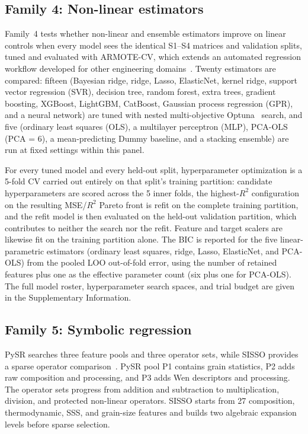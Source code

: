 \documentclass[5p,times,twocolumn]{elsarticle}
\newcommand{\familyfour}{Non-linear estimators}
\newcommand{\familyfive}{Symbolic regression}
\begin{document}
\subsection{Family 4: \familyfour}

Family~4 tests whether non-linear and ensemble estimators improve on linear controls when every model sees the identical S1--S4 matrices and validation splits, tuned and evaluated with ARMOTE-CV, which extends an automated regression workflow developed for other engineering domains~\cite{padhy2025automated,saurabh2026automated}. Twenty estimators are compared: fifteen (Bayesian ridge, ridge, Lasso, ElasticNet, kernel ridge, support vector regression (SVR), decision tree, random forest, extra trees, gradient boosting, XGBoost, LightGBM, CatBoost, Gaussian process regression (GPR), and a neural network) are tuned with nested multi-objective Optuna~\cite{optuna_2019} search, and five (ordinary least squares (OLS), a multilayer perceptron (MLP), PCA-OLS (PCA = 6), a mean-predicting Dummy baseline, and a stacking ensemble) are run at fixed settings within this panel.

For every tuned model and every held-out split, hyperparameter optimization is a 5-fold CV carried out entirely on that split's training partition: candidate hyperparameters are scored across the 5 inner folds, the highest-$R^2$ configuration on the resulting MSE/$R^2$ Pareto front is refit on the complete training partition, and the refit model is then evaluated on the held-out validation partition, which contributes to neither the search nor the refit. Feature and target scalers are likewise fit on the training partition alone. The BIC is reported for the five linear-parametric estimators (ordinary least squares, ridge, Lasso, ElasticNet, and PCA-OLS) from the pooled LOO out-of-fold error, using the number of retained features plus one as the effective parameter count (six plus one for PCA-OLS). The full model roster, hyperparameter search spaces, and trial budget are given in the Supplementary Information.

\subsection{Family 5: \familyfive}

PySR searches three feature pools and three operator sets, while SISSO provides a sparse operator comparison~\cite{Cranmer2023PySR,Ouyang2018SISSO}. PySR pool P1 contains grain statistics, P2 adds raw composition and processing, and P3 adds Wen descriptors and processing. The operator sets progress from addition and subtraction to multiplication, division, and protected non-linear operators. SISSO starts from 27 composition, thermodynamic, SSS, and grain-size features and builds two algebraic expansion levels before sparse selection.
\end{document}
